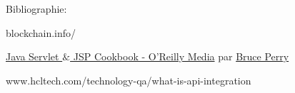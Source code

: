 \documentclass[12pt]{article}
\begin{document}
\begin{enumerate}
\newpage

\vspace{\baselineskip}
Bibliographie:\par

blockchain.info/\par

\href{http://shop.oreilly.com/product/9780596005726.do}{Java Servlet $\&$  JSP Cookbook - O'Reilly Media} par \href{http://www.oreillynet.com/pub/au/674}{Bruce Perry}\par

www.hcltech.com/technology-qa/what-is-api-integration\par


\vspace{\baselineskip}

\vspace{\baselineskip}
\setlength{\parskip}{6.96pt}

\end{enumerate}
\printbibliography
\end{document}
